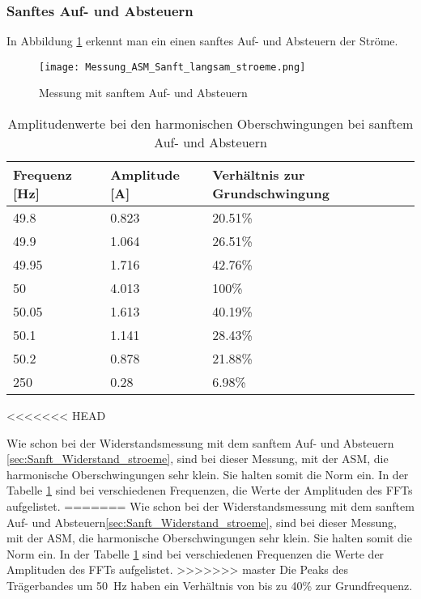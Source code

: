 \subsubsection*{Sanftes Auf- und Absteuern}

In Abbildung \ref{fig:Mess_Sanft_langsam_stroeme} erkennt man ein einen sanftes Auf- und Absteuern der Ströme.

\begin{figure}[ht!]
	\centering
	\texttt{[image: Messung\_ASM\_Sanft\_langsam\_stroeme.png]}	
	\caption{Messung mit sanftem Auf- und Absteuern}\label{fig:Mess_Sanft_langsam_stroeme}
\end{figure}


\begin{table}[ht!]
	\centering
	\begin{tabular}{|l|l|l|}
		\hline
		Frequenz {[}Hz{]} & Amplitude {[}A{]} & Verhältnis zur Grundschwingung	\\ \hline
		49.8              & 0.823             & 20.51\%							\\ \hline
		49.9              & 1.064             & 26.51\%							\\ \hline
		49.95             & 1.716             & 42.76\%							\\ \hline
		50                & 4.013             & 100\%							\\ \hline
		50.05             & 1.613             & 40.19\%							\\ \hline
		50.1              & 1.141             & 28.43\%							\\ \hline
		50.2              & 0.878             & 21.88\%							\\ \hline
		250               & 0.28              & 6.98\%							\\ \hline
	\end{tabular}
	\caption{Amplitudenwerte bei den harmonischen Oberschwingungen bei sanftem Auf- und Absteuern}\label{tab:Sanft_langsam_ASM_stroeme}
\end{table}
<<<<<<< HEAD

Wie schon bei der Widerstandsmessung mit dem sanftem Auf- und Absteuern \ref{sec:Sanft_Widerstand_stroeme}, sind bei dieser Messung, mit der ASM, die harmonische Oberschwingungen sehr klein. Sie halten somit die Norm ein. In der Tabelle \ref{tab:Sanft_langsam_ASM_stroeme} sind bei verschiedenen Frequenzen, die Werte der Amplituden des FFTs aufgelistet.
=======
Wie schon bei der Widerstandsmessung mit dem sanftem Auf- und Absteuern\ref{sec:Sanft_Widerstand_stroeme}, sind bei dieser Messung, mit der ASM, die harmonische Oberschwingungen sehr klein. Sie halten somit die Norm ein. In der Tabelle \ref{tab:Sanft_langsam_ASM_stroeme} sind bei verschiedenen Frequenzen die Werte der Amplituden des FFTs aufgelistet.
>>>>>>> master
Die Peaks des Trägerbandes um \SI{50}{Hz} haben ein Verhältnis von bis zu 40\% zur Grundfrequenz.


